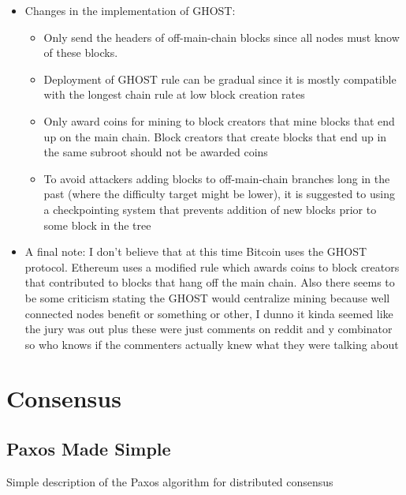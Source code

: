 \documentclass[a4paper]{article}
\begin{document}
\begin{itemize}
\item Changes in the implementation of GHOST:
\begin{itemize}
\item Only send the headers of off-main-chain blocks since all nodes must know of these blocks.

\item Deployment of GHOST rule can be gradual since it is mostly compatible with the longest chain rule at low block creation rates

\item Only award coins for mining to block creators that mine blocks that end up on the main chain. Block creators that create blocks that end up in the same subroot should not be awarded coins

\item To avoid attackers adding blocks to off-main-chain branches long in the past (where the difficulty target might be lower), it is suggested to using a checkpointing system that prevents addition of new blocks prior to some block in the tree
\end{itemize}

\item A final note: I don't believe that at this time Bitcoin uses the GHOST protocol. Ethereum uses a modified rule which awards coins to block creators that contributed to blocks that hang off the main chain. Also there seems to be some criticism stating the GHOST would centralize mining because well connected nodes benefit or something or other, I dunno it kinda seemed like the jury was out plus these were just comments on reddit and y combinator so who knows if the commenters actually knew what they were talking about
\end{itemize}

\section{Consensus}

\subsection{Paxos Made Simple}
Simple description of the Paxos algorithm for distributed consensus
\end{document}
